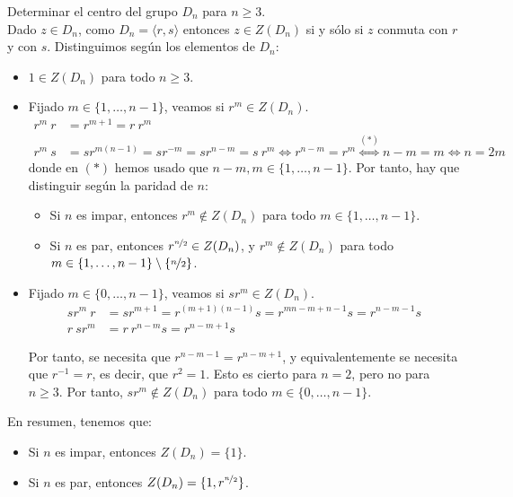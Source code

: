 \begin{ejercicio}
    Determinar el centro del grupo $D_n$ para $n\geq 3$.\\

    Dado $z\in D_n$, como $D_n=\langle r,s\rangle$ entonces $z\in Z(D_n)$ si y sólo si $z$ conmuta con $r$ y con $s$.
    Distinguimos según los elementos de $D_n$:
    \begin{itemize}
        \item $1\in Z(D_n)$ para todo $n\geq 3$.
        \item Fijado $m\in\{1,\ldots,n-1\}$, veamos si $r^m\in Z(D_n)$.
        \begin{align*}
            r^m\ r &= r^{m+1} = r\ r^m\\
            r^m\ s &= sr^{m(n-1)} = sr^{-m} = sr^{n-m} = s\ r^m\iff r^{n-m}=r^m
            \stackrel{(\ast)}{\iff} n-m=m\iff n=2m
        \end{align*}
        donde en $(\ast)$ hemos usado que $n-m,m\in\{1,\ldots,n-1\}$. Por tanto, hay que distinguir según la paridad de $n$:
        \begin{itemize}
            \item Si $n$ es impar, entonces $r^m \notin Z(D_n)$ para todo $m\in\{1,\ldots,n-1\}$.
            \item Si $n$ es par, entonces $r^{\nicefrac{n}{2}}\in Z(D_n)$, y $r^m\notin Z(D_n)$ para todo $m\in\{1,\ldots,n-1\}\setminus \{\nicefrac{n}{2}\}$.
        \end{itemize}

        \item Fijado $m\in\{0,\ldots,n-1\}$, veamos si $sr^m\in Z(D_n)$.
        \begin{align*}
            sr^m\ r &= sr^{m+1} = r^{(m+1)(n-1)}s = r^{mn -m + n -1}s = r^{n-m-1}s\\
            r\ sr^m &= r\ r^{n-m}s = r^{n-m+1}s
        \end{align*}

        Por tanto, se necesita que $r^{n-m-1}=r^{n-m+1}$, y equivalentemente se necesita que $r^{-1}=r$, es decir, que $r^2=1$. Esto es cierto para $n=2$, pero no para $n\geq 3$. Por tanto, $sr^m\notin Z(D_n)$ para todo $m\in\{0,\ldots,n-1\}$.
    \end{itemize}

    En resumen, tenemos que:
    \begin{itemize}
        \item Si $n$ es impar, entonces $Z(D_n)=\{1\}$.
        \item Si $n$ es par, entonces $Z(D_n)=\{1,r^{\nicefrac{n}{2}}\}$.
    \end{itemize}
\end{ejercicio}

